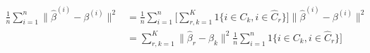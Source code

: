 \documentclass[12pt]{article}
\begin{document}
\begin{align*}
	\frac1n \sum_{i=1}^n \| \hat\beta^{(i)} - \beta^{(i)} \|^2 
		&=\frac1n \sum_{i=1}^n\Big[
		\sum_{r,k=1}^K  1\{ i \in C_k,  i \in \hat  C_r\}\Big] 
		\| \hat\beta^{(i)} - \beta^{(i)} \|^2\\
	   &=	 \sum_{r,k=1}^K 	\| \hat\beta_r - \beta_k \|^2	\frac1n \sum_{i=1}^n 1\{ i \in C_k,  i \in \hat  C_r\}\Big] 
\end{align*}

\cleardoublepage

\small



\end{document}
